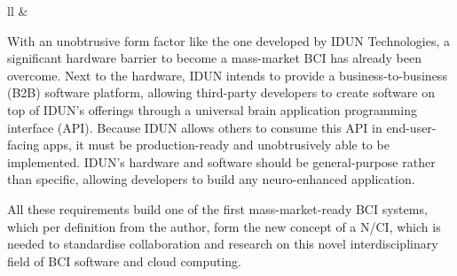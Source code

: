 \begin{table}[ht]
{\begin{tabular}{ll}
        &
                                                                                                               \\ \hline
    \end{tabular}%
  }
  \vspace{10pt}
  \caption{Axes label descriptions of the three-dimensionality for the definition of a N/CI as shown on \autoref{fig:nci-definition}}
  \label{tab:nci-axis}
\end{table}

\newpage

With an unobtrusive form factor like the one developed by IDUN Technologies, a significant hardware barrier to become a mass-market BCI has already been overcome. Next to the hardware, IDUN intends to provide a business-to-business (B2B) software platform, allowing third-party developers to create software on top of IDUN's offerings through a universal brain application programming interface (API). Because IDUN allows others to consume this API in end-user-facing apps, it must be production-ready and unobtrusively able to be implemented. IDUN's hardware and software should be general-purpose rather than specific, allowing developers to build any neuro-enhanced application. 

All these requirements build one of the first mass-market-ready BCI systems, which per definition from the author, form the new concept of a N/CI, which is needed to standardise collaboration and research on this novel interdisciplinary field of BCI software and cloud computing.

